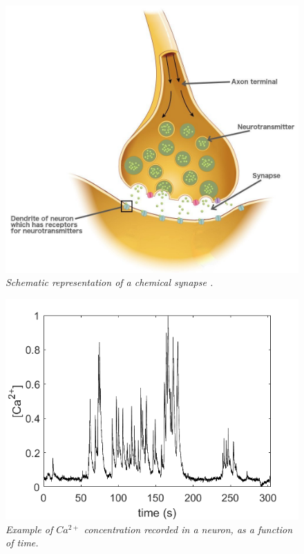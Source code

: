 \documentclass[12pt, a4paper]{report}
\begin{document}
 
 \begin{figure}[H]
 	\begin{center}
 		\includegraphics[scale=0.2]{synapse.jpg} 
 	\end{center} 
 	\caption{\textit{Schematic representation of a chemical synapse \cite{44}.}}\label{synapse}
 	
 \end{figure}

\begin{figure}[H]
	\begin{center}
		\includegraphics[scale=.50]{Ca_conc.png} 
	\end{center} 
	\caption{\textit{Example of $Ca^{2+}$ concentration recorded in a neuron, as a function of time.}} \label{oscillations}
	
\end{figure}
	
\end{document}
